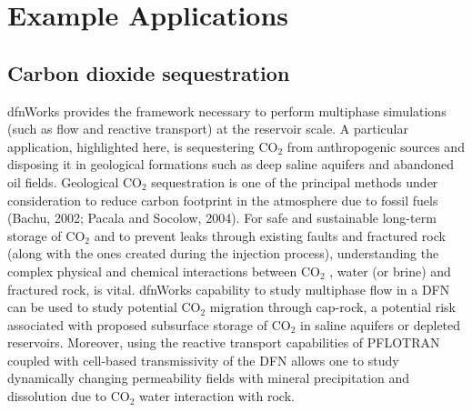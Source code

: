 \documentclass[letterpaper,10pt,english]{sphinxmanual}
\begin{document}
\begin{DUlineblock}{0em}
\item[] 
\item[] 
\end{DUlineblock}

\begin{figure}[htbp]
\centering

\noindent{}
\end{figure}

\begin{DUlineblock}{0em}
\item[] 
\item[] 
\end{DUlineblock}


\chapter{Example Applications}
\label{\detokenize{applications::doc}}\label{\detokenize{applications:example-applications}}

\section{Carbon dioxide sequestration}
\label{\detokenize{applications:carbon-dioxide-sequestration}}
dfnWorks provides the framework necessary to perform multiphase simulations (such as flow and reactive transport) at the reservoir scale. A particular application, highlighted here, is sequestering CO$_{\text{2}}$  from anthropogenic sources and disposing it in geological formations such as deep saline aquifers and abandoned oil fields. Geological CO$_{\text{2}}$  sequestration is one of the principal methods under consideration to reduce carbon footprint in the atmosphere due to fossil fuels (Bachu, 2002; Pacala and Socolow, 2004). For safe and sustainable long-term storage of CO$_{\text{2}}$  and to prevent leaks through existing faults and fractured rock (along with the ones created during the injection process), understanding the complex physical and chemical interactions between CO$_{\text{2}}$ , water (or brine) and fractured rock, is vital. dfnWorks capability to study multiphase flow in a DFN can be used to study potential CO$_{\text{2}}$  migration through cap-rock, a potential risk associated with proposed subsurface storage of CO$_{\text{2}}$  in saline aquifers or depleted reservoirs. Moreover, using the reactive transport capabilities of PFLOTRAN coupled with cell-based transmissivity of the DFN allows one to study dynamically changing permeability fields with mineral precipitation and dissolution due to CO$_{\text{2}}$ \textendash{}water interaction with rock.
\end{document}
